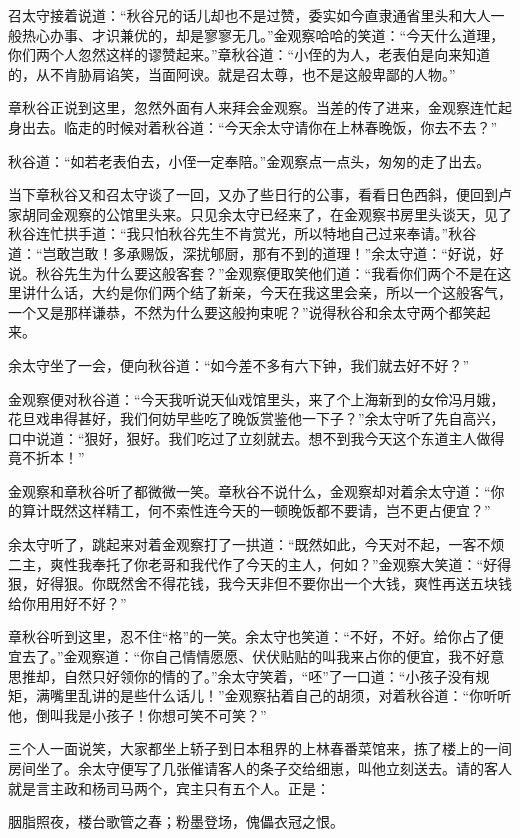 \documentclass[12pt,UTF8]{ctexbook}
\begin{document}
{{{召太守接着说道：“秋谷兄的话儿却也不是过赞，委实如今直隶通省里头和大人一般热心办事、才识兼优的，却是寥寥无几。”金观察哈哈的笑道：“今天什么道理，你们两个人忽然这样的谬赞起来。”章秋谷道：“小侄的为人，老表伯是向来知道的，从不肯胁肩谄笑，当面阿谀。就是召太尊，也不是这般卑鄙的人物。”

章秋谷正说到这里，忽然外面有人来拜会金观察。当差的传了进来，金观察连忙起身出去。临走的时候对着秋谷道：“今天余太守请你在上林春晚饭，你去不去？”

秋谷道：“如若老表伯去，小侄一定奉陪。”金观察点一点头，匆匆的走了出去。

当下章秋谷又和召太守谈了一回，又办了些日行的公事，看看日色西斜，便回到卢家胡同金观察的公馆里头来。只见余太守已经来了，在金观察书房里头谈天，见了秋谷连忙拱手道：“我只怕秋谷先生不肯赏光，所以特地自己过来奉请。”秋谷道：“岂敢岂敢！多承赐饭，深扰郇厨，那有不到的道理！”余太守道：“好说，好说。秋谷先生为什么要这般客套？”金观察便取笑他们道：“我看你们两个不是在这里讲什么话，大约是你们两个结了新亲，今天在我这里会亲，所以一个这般客气，一个又是那样谦恭，不然为什么要这般拘束呢？”说得秋谷和余太守两个都笑起来。

余太守坐了一会，便向秋谷道：“如今差不多有六下钟，我们就去好不好？”

金观察便对秋谷道：“今天我听说天仙戏馆里头，来了个上海新到的女伶冯月娥，花旦戏串得甚好，我们何妨早些吃了晚饭赏鉴他一下子？”余太守听了先自高兴，口中说道：“狠好，狠好。我们吃过了立刻就去。想不到我今天这个东道主人做得竟不折本！”

金观察和章秋谷听了都微微一笑。章秋谷不说什么，金观察却对着余太守道：“你的算计既然这样精工，何不索性连今天的一顿晚饭都不要请，岂不更占便宜？”

余太守听了，跳起来对着金观察打了一拱道：“既然如此，今天对不起，一客不烦二主，爽性我奉托了你老哥和我代作了今天的主人，何如？”金观察大笑道：“好得狠，好得狠。你既然舍不得花钱，我今天非但不要你出一个大钱，爽性再送五块钱给你用用好不好？”

章秋谷听到这里，忍不住“格”的一笑。余太守也笑道：“不好，不好。给你占了便宜去了。”金观察道：“你自己情情愿愿、伏伏贴贴的叫我来占你的便宜，我不好意思推却，自然只好领你的情的了。”余太守笑着，“呸”了一口道：“小孩子没有规矩，满嘴里乱讲的是些什么话儿！”金观察拈着自己的胡须，对着秋谷道：“你听听他，倒叫我是小孩子！你想可笑不可笑？”

三个人一面说笑，大家都坐上轿子到日本租界的上林春番菜馆来，拣了楼上的一间房间坐了。余太守便写了几张催请客人的条子交给细崽，叫他立刻送去。请的客人就是言主政和杨司马两个，宾主只有五个人。正是：

胭脂照夜，楼台歌管之春；粉墨登场，傀儡衣冠之恨。

}}}
\end{document}
